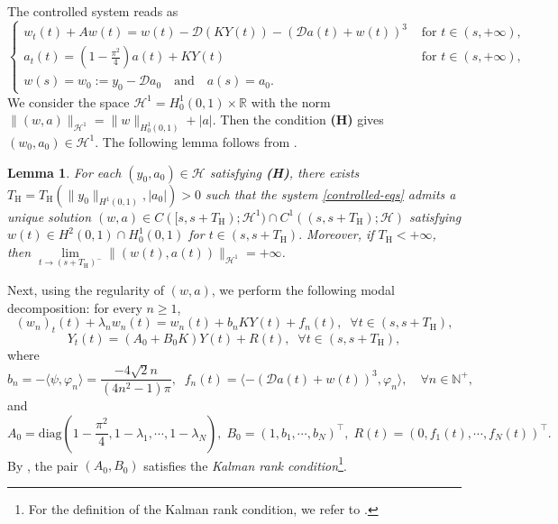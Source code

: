\documentclass[a4paper]{article}
\newtheorem{lemma}[theorem]{Lemma}
\numberwithin{equation}{section}
\begin{document}
The controlled system reads as
\begin{equation} \label{controlled-eqs}
    \left\{\begin{array}{ll}
 w_t(t)+A w (t)=w(t)-\mathcal{D}(KY(t))-\left(\mathcal{D}a(t)+w(t)\right)^3&\text{ for } t\in(s,+\infty),\\[2mm]
a_t(t)=(1- \frac{\pi^2}{4})a(t)+KY(t)&\text{ for } t\in  (s,+\infty),\\[2mm]
w(s )=w_0:=y_0-\mathcal{D}a_0\quad \text{and} \quad a(s)=a_0.
\end{array}\right.
\end{equation}
We consider the space $\mathcal{H}^1=H^1_0(0,1) \times\mathbb{R}$ with the norm $\|(w,a)\|_{\mathcal{H}^1}=\|w\|_{H^1_0(0,1)}+|a|$. Then the condition \textbf{(H)} gives $(w_0,a_0)\in\mathcal{H}^1$. The following lemma follows
from \cite[Lemma 5]{XZ}.
\begin{lemma}
\label{Well-posedness-th}
For each $(y_0,a_0)\in\mathcal{H}$ satisfying \textbf{(H)}, there exists $T_{\text{H}}=T_{\text{H}}\left(\|y_0\|_{H^1(0,1)},|a_0|\right)>0$ such that the system \eqref{controlled-eqs} admits a unique solution $(w,a)\in C([s,s+T_{\text{H}});\mathcal{H}^1)\cap C^1((s,s+T_{\text{H}});\mathcal{H})$ satisfying $w(t)\in H^2(0,1)\cap H^1_0(0,1)$ for $t\in(s,s+T_{\text{H}}).$ Moreover, if $T_{\text{H}}<+\infty$, then $\lim\limits_{t\to (s+T_{\text{H}})^-}\|(w(t),a(t))\|_{\mathcal{H}^1}=+\infty$.
\end{lemma}
Next, using the regularity of $(w,a)$, we perform the following modal decomposition: for every $n\ge 1$, 
 \begin{equation} \label{mode-eq-heat} 
 (w_n)_t(t)+\lambda_n w_n(t)=w_n(t)+b_n KY(t)+f_n(t),\;\;\forall t\in (s,s+T_{\text{H}}),
 \end{equation}
\begin{equation}\label{mode-eq-new-heat}
 Y_t(t)=(A_0+B_0K)Y(t)+R(t),\;\;\forall t\in (s,s+T_{\text{H}}),
\end{equation}
where  $$b_n=-\langle \psi,\varphi_n\rangle=\frac{-4\sqrt{2}n}{(4n^2-1)\pi},\;\; f_n(t)=\langle -\left(\mathcal{D}a(t)+w(t)\right)^3,\varphi_n\rangle, \quad \forall n\in \mathbb{N}^+,$$
and $$A_0=\text{diag}(1-\frac{\pi^2}{4},1-\lambda_1,\cdots,1-\lambda_N),\;B_0=(1,b_1,\cdots,b_N)^\top,\;R(t)=(0,f_1(t),\cdots,f_N(t))^\top.$$
By \cite[Lemma 4]{XZ}, the pair $(A_0,B_0)$ satisfies the \textit{Kalman rank condition}\footnote{For the definition of the Kalman rank condition, we refer to \cite[Chapter 1]{Trelat}.}. \\[-3mm]
\end{document}
